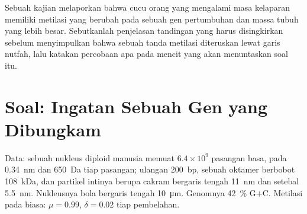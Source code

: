 \begin{exercise}[$\star\star\star$]\label{exo:b3:chromatin-epigenetics:12}
Sebuah kajian melaporkan bahwa cucu orang yang mengalami masa kelaparan
memiliki metilasi yang berubah pada sebuah gen pertumbuhan dan massa tubuh
yang lebih besar. Sebutkanlah penjelasan tandingan yang harus disingkirkan
sebelum menyimpulkan bahwa sebuah tanda metilasi diteruskan lewat garis
nutfah, lalu katakan percobaan apa pada mencit yang akan menuntaskan soal itu.
\end{exercise}

\section{Soal: Ingatan Sebuah Gen yang Dibungkam}

\begin{problem}
\label{pb:b3:chromatin-epigenetics:1}
Data: sebuah nukleus diploid manusia memuat $6.4\times 10^{9}$ pasangan basa,
pada \qty{0.34}{nm} dan \qty{650}{Da} tiap pasangan; ulangan 
\qty{200}{bp}, sebuah oktamer  berbobot \qty{108}{kDa}, dan partikel
intinya berupa cakram bergaris tengah \qty{11}{nm} dan setebal \qty{5.5}{nm}.
Nukleusnya bola bergaris tengah \qty{10}{\micro m}. Genomnya
\qty{42}{\%} G$+$C. Metilasi pada  biasa: $\mu = 0.99$,
$\delta = 0.02$ tiap pembelahan.


\end{problem}
